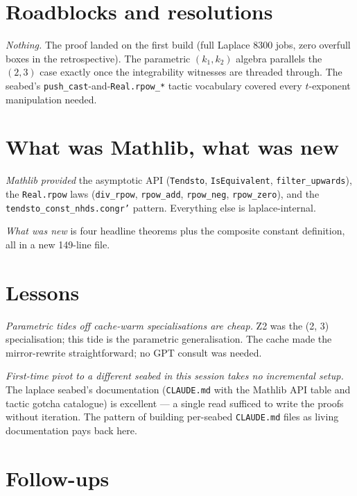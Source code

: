\documentclass[11pt]{article}
\begin{document}
\section{Roadblocks and resolutions}

\emph{Nothing.} The proof landed on the first build (full Laplace
8300 jobs, zero overfull boxes in the retrospective). The parametric
$(k_1, k_2)$ algebra parallels the $(2, 3)$ case exactly once the
integrability witnesses are threaded through. The seabed's
\texttt{push\_cast}-and-\texttt{Real.rpow\_*} tactic vocabulary
covered every $t$-exponent manipulation needed.

\section{What was Mathlib, what was new}

\emph{Mathlib provided} the asymptotic API (\texttt{Tendsto},
\texttt{IsEquivalent}, \texttt{filter\_upwards}), the
\texttt{Real.rpow} laws (\texttt{div\_rpow}, \texttt{rpow\_add},
\texttt{rpow\_neg}, \texttt{rpow\_zero}), and the
\texttt{tendsto\_const\_nhds.congr'} pattern. Everything else is
laplace-internal.

\emph{What was new} is four headline theorems plus the composite
constant definition, all in a new 149-line file.

\section{Lessons}

\emph{Parametric tides off cache-warm specialisations are cheap.}
Z2 was the (2, 3) specialisation; this tide is the parametric
generalisation. The cache made the mirror-rewrite straightforward;
no GPT consult was needed.

\emph{First-time pivot to a different seabed in this session takes
no incremental setup.} The laplace seabed's documentation
(\texttt{CLAUDE.md} with the Mathlib API table and tactic gotcha
catalogue) is excellent --- a single read sufficed to write the
proofs without iteration. The pattern of building per-seabed
\texttt{CLAUDE.md} files as living documentation pays back here.

\section{Follow-ups}
\end{document}
